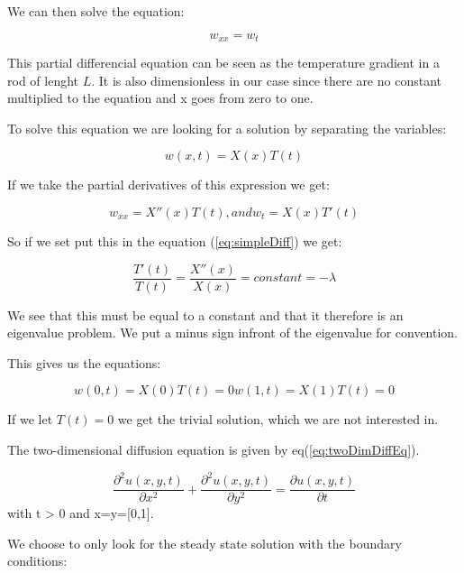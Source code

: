 \documentclass[a4paper,10pt]{article}
\begin{document}
We can then solve the equation:

\begin{equation}
 w_{xx}=w_t
 \label{eq:simpleDiff}
\end{equation}

This partial differencial equation can be seen as the temperature gradient in a rod of lenght $L$. It is also dimensionless in our case
since there are no constant multiplied to the equation and x goes from zero to one.

To solve this equation we are looking for a solution by separating the variables:

\begin{equation}
w(x,t) = X(x)T(t)
\label{eq:seperating}
\end{equation}

If we take the partial derivatives of this expression we get:

\begin{equation}
w_{xx} = X''(x)T(t) ,and w_t = X(x)T'(t)
\label{eq:deriv}
\end{equation}

So if we set put this in the equation (\ref{eq:simpleDiff}) we get:

\begin{equation}
\frac{T'(t)}{T(t)} = \frac{X''(x)}{X(x)} = constant = -\lambda
\label{eq:eigValue}
\end{equation}

We see that this must be equal to a constant and that it therefore is an eigenvalue problem. We put a minus sign infront of the eigenvalue for convention.

This gives us the equations:

\begin{equation}
w(0,t) = X(0)T(t) = 0 
w(1,t) = X(1)T(t) = 0
\label{eq:initialCond}
\end{equation}

If we let $T(t) = 0$ we get the trivial solution, which we are not interested in.

The two-dimensional diffusion equation is given by eq(\ref{eq:twoDimDiffEq}).

\begin{equation}
  \frac{\partial^2 u(x,y,t)}{\partial x^2} + \frac{\partial^2 u(x,y,t)}{\partial y^2} = \frac{\partial u(x,y,t)}{\partial t}
\label{eq:twoDimDiffEq}
\end{equation}
with t > 0 and x=y=[0,1].

We choose to only look for the steady state solution with the boundary conditions:
\end{document}
